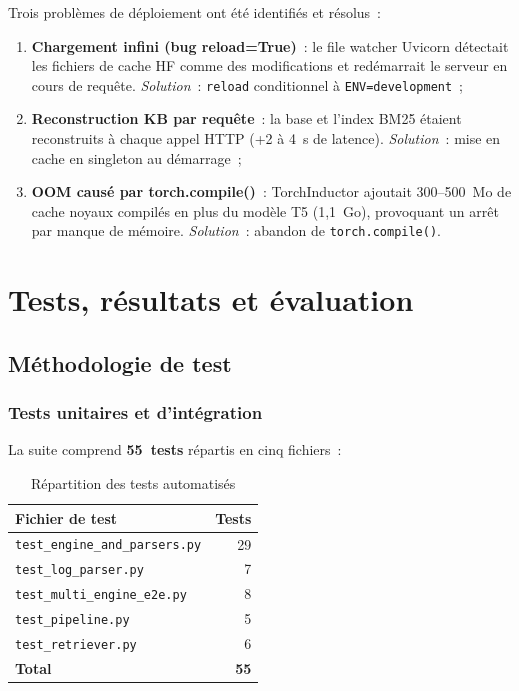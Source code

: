 \documentclass[12pt,a4paper]{report}
\begin{document}
Trois probl\`emes de d\'eploiement ont \'et\'e identifi\'es et r\'esolus~:

\begin{enumerate}[leftmargin=*]
  \item \textbf{Chargement infini (bug reload=True)}~: le file watcher Uvicorn
        d\'etectait les fichiers de cache HF comme des modifications et red\'emarrait
        le serveur en cours de requ\^ete. \textit{Solution}~: \texttt{reload}
        conditionnel \`a \texttt{ENV=development}~;

  \item \textbf{Reconstruction KB par requ\^ete}~: la base et l'index BM25 \'etaient
        reconstruits \`a chaque appel HTTP (+2 \`a 4~s de latence).
        \textit{Solution}~: mise en cache en singleton au d\'emarrage~;

  \item \textbf{OOM caus\'e par torch.compile()}~: TorchInductor ajoutait 300--500~Mo
        de cache noyaux compil\'es en plus du mod\`ele T5 (1,1~Go), provoquant un
        arr\^et par manque de m\'emoire.
        \textit{Solution}~: abandon de \texttt{torch.compile()}.
\end{enumerate}

\chapter{Tests, r\'esultats et \'evaluation}

\section{M\'ethodologie de test}

\subsection{Tests unitaires et d'int\'egration}

La suite comprend \textbf{55~tests} r\'epartis en cinq fichiers~:

\begin{table}[H]
  \centering
  \caption{R\'epartition des tests automatis\'es}
  \label{tab:tests}
  \begin{tabular}{lr}
    \toprule
    \textbf{Fichier de test} & \textbf{Tests} \\
    \midrule
    \texttt{test\_engine\_and\_parsers.py} & 29 \\
    \texttt{test\_log\_parser.py}          & 7 \\
    \texttt{test\_multi\_engine\_e2e.py}   & 8 \\
    \texttt{test\_pipeline.py}             & 5 \\
    \texttt{test\_retriever.py}            & 6 \\
    \midrule
    \textbf{Total}                         & \textbf{55} \\
    \bottomrule
  \end{tabular}
\end{table}
\end{document}
